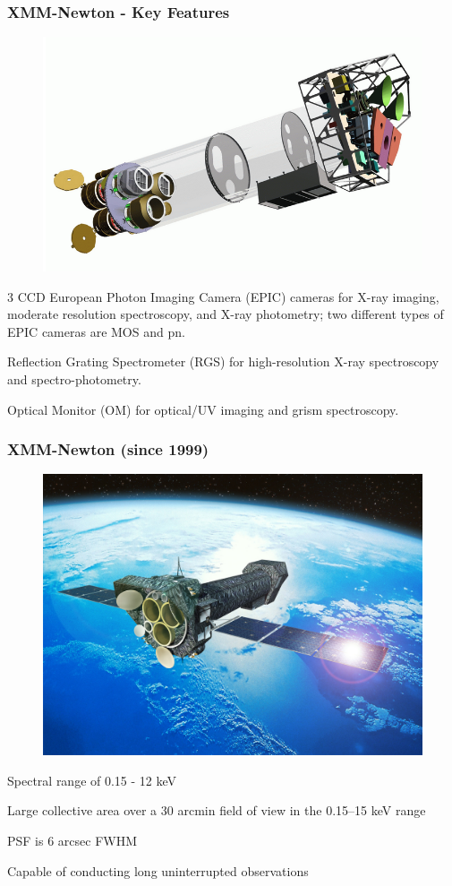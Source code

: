 \documentclass[]{beamer}
\begin{document}
\begin{frame}
\frametitle{XMM-Newton - Key Features}
\begin{figure}
\includegraphics[scale=.25]{xmm-newton-glass.png} 
\end{figure}
\item 3 CCD European Photon Imaging Camera (EPIC) 
cameras for X-ray imaging, moderate resolution spectroscopy, and X-ray photometry; two different types of EPIC cameras are MOS and pn.
\item Reflection Grating Spectrometer (RGS) for high-resolution X-ray spectroscopy and spectro-photometry.
\item Optical Monitor (OM) for optical/UV imaging and grism spectroscopy. 
\end{frame}

\begin{frame}
\frametitle{XMM-Newton (since 1999)}
\begin{figure}
\includegraphics[scale=.30]{XMM-Newton_1500.jpg} 
\end{figure}
\item Spectral range of 0.15 - 12 keV
\item Large collective area over a 30 arcmin field of view in the 0.15--15 keV range
\item PSF is 6 arcsec FWHM
\item Capable of conducting long uninterrupted observations
\end{frame}
\end{document}
